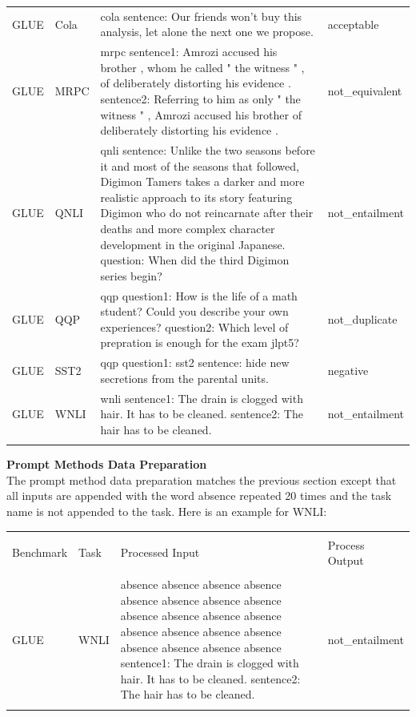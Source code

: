 \documentclass[final,6p,times,twocolumn,authoryear]{elsarticle}
\begin{document}
\begin{table}[!htbp]
\begin{tabularx}{\textwidth}{l l X l}
        GLUE & Cola & cola sentence: Our friends won't buy this analysis, let alone the next one we propose. & acceptable \\
        GLUE & MRPC & mrpc sentence1: Amrozi accused his brother , whom he called " the witness " , of deliberately distorting his evidence . sentence2: Referring to him as only " the witness " , Amrozi accused his brother of deliberately distorting his evidence . & not\_equivalent \\
        GLUE & QNLI & qnli sentence: Unlike the two seasons before it and most of the seasons that followed, Digimon Tamers takes a darker and more realistic approach to its story featuring Digimon who do not reincarnate after their deaths and more complex character development in the original Japanese. question: When did the third Digimon series begin? & not\_entailment \\
        GLUE & QQP & qqp question1: How is the life of a math student? Could you describe your own experiences? question2: Which level of prepration is enough for the exam jlpt5? & not\_duplicate \\
        GLUE & SST2 & qqp question1: sst2 sentence: hide new secretions from the parental units. & negative \\
        GLUE & WNLI & wnli sentence1: The drain is clogged with hair. It has to be cleaned. sentence2: The hair has to be cleaned. & not\_entailment \\
    \hline 
    \hline \\[-1.8ex] 
    \end{tabularx}
    \label{data_prep} 
\end{table} 

\newpage

\textbf{Prompt Methods Data Preparation} \\
The prompt method data preparation matches the previous section except that all inputs are appended with the word absence repeated 20 times and the task name is not appended to the task. Here is an example for WNLI:

\begin{table}[!htbp]
    \centering
    \begin{tabularx}{\textwidth}{l l X l} 
        \\[-1.8ex]\hline 
        \hline \\
        Benchmark & Task & Processed Input & Process Output \\ 
        \hline \\[-1.8ex]
        GLUE & WNLI & absence  absence  absence  absence  absence  absence  absence  absence  absence  absence  absence  absence  absence  absence  absence  absence  absence  absence  absence  absence  sentence1: The drain is clogged with hair. It has to be cleaned. sentence2: The hair has to be cleaned. & not\_entailment \\
    \hline 
    \hline \\[-1.8ex] 
    \end{tabularx}
    \label{data_prep} 
\end{table}
\end{document}
